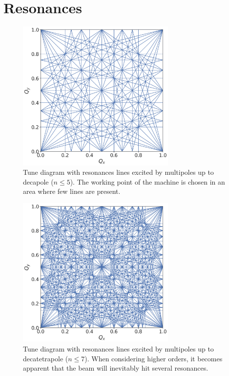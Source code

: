 \section{Resonances}


%

\begin{figure}[H]
    \centering
    \includegraphics[width=0.7\textwidth]{images/resonance_diagaram_n5.png}
    \caption{Tune diagram with resonances lines excited by multipoles up to decapole ($n \leq 5$).
             The working point of the machine is chosen in an area where few lines are present.}
    \label{fig:resonances:diagram_n5}
\end{figure}


\begin{figure}[H]
    \centering
    \includegraphics[width=0.7\textwidth]{images/resonance_diagaram_n7.png}
    \caption{Tune diagram with resonances lines excited by multipoles up to decatetrapole 
             ($n \leq 7$). When considering higher orders, it becomes apparent that the beam will
             inevitably hit several resonances.}
    \label{fig:resonances:diagram_n7}
\end{figure}